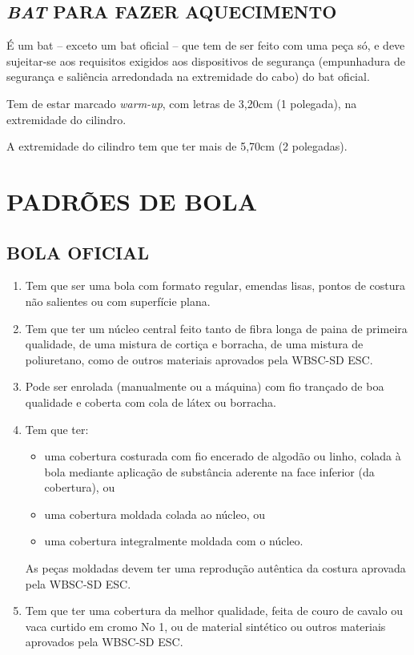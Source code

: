 \section{\textit{BAT} PARA FAZER AQUECIMENTO}

É um \gls{bat} -- exceto um \gls{bat} oficial -- que tem de ser feito com uma peça só, e deve sujeitar-se aos requisitos exigidos aos dispositivos de segurança (empunhadura de segurança e saliência arredondada na extremidade do cabo) do \gls{bat} oficial.

Tem de estar marcado \textit{warm-up}, com letras de 3,20cm (1 \textonequarter{}  polegada), na extremidade do cilindro.

A extremidade do cilindro tem que ter mais de 5,70cm (2 \textonequarter{}  polegadas).

\chapter{PADRÕES DE BOLA}
\minitoc%

\section{BOLA OFICIAL}

\begin{enumerate}[label=(\arabic*)]
	\item   Tem que ser uma bola com formato regular, emendas lisas, pontos de costura não salientes ou com superfície plana.
	\item  Tem que ter um núcleo central feito tanto de fibra longa de paina de primeira qualidade, de uma mistura de cortiça e borracha, de uma mistura de poliuretano, como de outros materiais aprovados pela WBSC-SD \gls{ESC}.
	\item  Pode ser enrolada (manualmente ou a máquina) com fio trançado de boa qualidade e coberta com cola de látex ou borracha.
	\item  Tem que ter:
	\begin{itemize}
		\item 	uma cobertura costurada com fio encerado de algodão ou linho, colada à bola mediante aplicação de substância aderente na face inferior (da cobertura), ou
		\item uma cobertura moldada colada ao núcleo, ou
		\item uma cobertura integralmente moldada com o núcleo.
	\end{itemize}


	As peças moldadas devem ter uma reprodução autêntica da costura aprovada pela WBSC-SD \gls{ESC}.
	\item  Tem que ter uma cobertura da melhor qualidade, feita de couro de cavalo ou vaca curtido em cromo No 1, ou de material sintético ou outros materiais aprovados pela WBSC-SD \gls{ESC}.
\end{enumerate}

